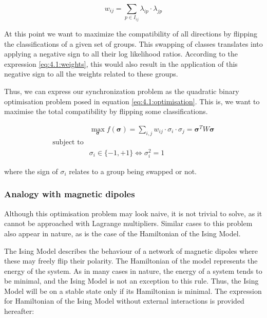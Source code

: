\documentclass[../main.tex]{subfiles}
\begin{document}
\begin{equation}\label{eq:4.1:weights}
    w_{ij} = \sum_{p \in I_{ij}} \lambda_{ip} \cdot \lambda_{jp}
\end{equation}

At this point we want to maximize the compatibility of all directions by flipping the classifications of a given set of groups. This swapping of classes translates into applying a negative sign to all their log likelihood ratios. According to the expression \eqref{eq:4.1:weights}, this would also result in the application of this negative sign to all the weights related to these groups. 

Thus, we can express our synchronization problem as the quadratic binary optimisation problem posed in equation \eqref{eq:4.1:optimisation}. This is, we want to maximise the total compatibility by flipping some classifications.

\begin{equation}\label{eq:4.1:optimisation}
\begin{aligned}
    & \max_{\bm{\sigma}} f(\bm{\sigma}) = \sum_{i, j} w_{ij} \cdot \sigma_i \cdot \sigma_j = \bm{\sigma}^T W \bm{\sigma}\\
    \text{subject to}\\
    & \sigma_i \in \{-1, +1\} \Leftrightarrow \sigma_i^2 = 1
\end{aligned}
\end{equation}

where the sign of $\sigma_i$ relates to a group being swapped or not. 

\subsubsection{Analogy with magnetic dipoles}
Although this optimisation problem may look naive, it is not trivial to solve, as it cannot be approached with Lagrange multipliers. Similar cases to this problem also appear in nature, as is the case of the Hamiltonian of the Ising Model\cite{kennedy2008}.

The Ising Model describes the behaviour of a network of magnetic dipoles where these may freely flip their polarity. The Hamiltonian of the model represents the energy of the system\cite{kennedy2008}. As in many cases in nature, the energy of a system tends to be minimal, and the Ising Model is not an exception to this rule. Thus, the Ising Model will be on a stable state only if its Hamiltonian is minimal. The expression for Hamiltonian of the Ising Model without external interactions is provided hereafter:
\end{document}
